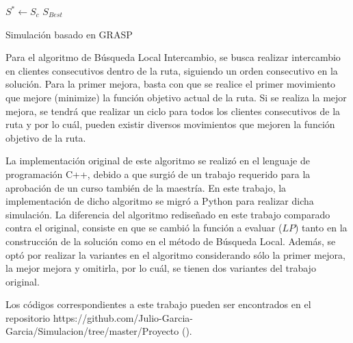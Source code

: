 \documentclass[review]{elsarticle}
\begin{document}
\begin{algorithm}[H]\footnotesize		
	$S^* \leftarrow S_c$ \;
\Return $S_{Best}$

	\label{algoritmo}
	\caption{Simulación basado en GRASP}	
\end{algorithm}

Para el algoritmo de Búsqueda Local Intercambio, se busca realizar intercambio en clientes consecutivos dentro de la ruta, siguiendo un orden consecutivo en la solución. Para la primer mejora, basta con que se realice el primer movimiento que mejore (minimize) la función objetivo actual de la ruta. Si se realiza la mejor mejora, se tendrá que realizar un ciclo para todos los clientes consecutivos de la ruta y por lo cuál, pueden existir diversos movimientos que mejoren la función objetivo de la ruta. 
	
 La implementación original de este algoritmo se realizó en el lenguaje de programación C++, debido a que surgió de un trabajo requerido para la aprobación de un curso también de la maestría. En este trabajo, la implementación de dicho algoritmo se migró a Python para realizar dicha simulación. La diferencia del algoritmo rediseñado en este trabajo comparado contra el original, consiste en que se cambió la función a evaluar ($LP$) tanto en la construcción de la solución como en el método de Búsqueda Local. Además, se optó por realizar la variantes en el algoritmo considerando sólo la primer mejora, la mejor mejora y omitirla, por lo cuál, se tienen dos variantes del trabajo original.

Los códigos correspondientes a este trabajo pueden ser encontrados en el repositorio https://github.com/Julio-Garcia-Garcia/Simulacion/tree/master/Proyecto (\cite{repositorio}).
\end{document}
